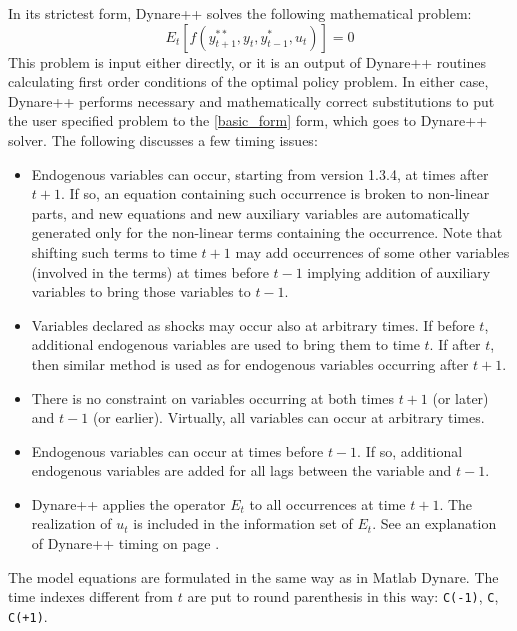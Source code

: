 \documentclass[10pt]{article}
\begin{document}
In its strictest form, Dynare++ solves the following mathematical problem:
\begin{equation}\label{basic_form}
E_t[f(y^{**}_{t+1},y_t,y^*_{t-1},u_t)]=0
\end{equation}
This problem is input either directly, or it is an output of Dynare++
routines calculating first order conditions of the optimal policy
problem. In either case, Dynare++ performs necessary and
mathematically correct substitutions to put the user specified problem
to the \eqref{basic_form} form, which goes to Dynare++ solver. The
following discusses a few timing issues:
\begin{itemize}
\item Endogenous variables can occur, starting from version 1.3.4, at
times after $t+1$. If so, an equation containing such occurrence is
broken to non-linear parts, and new equations and new auxiliary
variables are automatically generated only for the non-linear terms
containing the occurrence. Note that shifting such terms to time $t+1$
may add occurrences of some other variables (involved in the terms) at
times before $t-1$ implying addition of auxiliary variables to bring
those variables to $t-1$.
\item Variables declared as shocks may occur also at arbitrary
times. If before $t$, additional endogenous variables are used to
bring them to time $t$. If after $t$, then similar method is used as
for endogenous variables occurring after $t+1$.
\item There is no constraint on variables occurring at both times
$t+1$ (or later) and $t-1$ (or earlier). Virtually, all variables can
occur at arbitrary times.
\item Endogenous variables can occur at times before $t-1$. If so,
additional endogenous variables are added for all lags between the
variable and $t-1$.
\item Dynare++ applies the operator $E_t$ to all occurrences at time
$t+1$. The realization of $u_t$ is included in the information set of
$E_t$. See an explanation of Dynare++ timing on page \pageref{timing}.
\end{itemize}

The model equations are formulated in the same way as in Matlab
Dynare. The time indexes different from $t$ are put to round
parenthesis in this way: {\tt C(-1)}, {\tt C}, {\tt C(+1)}.
\end{document}
